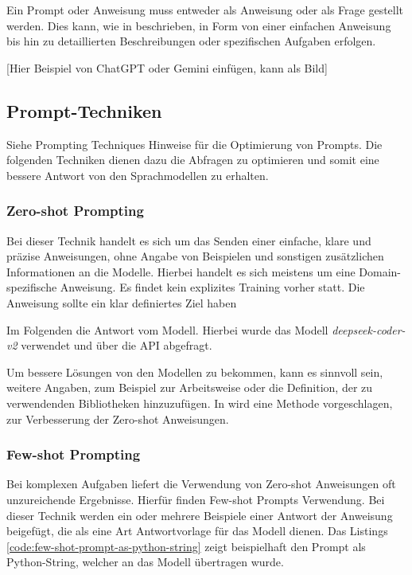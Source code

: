 Ein Prompt oder Anweisung muss entweder als Anweisung oder als Frage gestellt werden. Dies kann, wie in \cite{amatriain-2024} beschrieben, in Form von einer einfachen Anweisung bis hin zu detaillierten Beschreibungen oder spezifischen Aufgaben erfolgen.\vspace{0.2cm}

[Hier Beispiel von ChatGPT oder Gemini einfügen, kann als Bild]


\subsection{Prompt-Techniken}
Siehe Prompting Techniques Hinweise für die Optimierung von Prompts.
Die folgenden Techniken dienen dazu die Abfragen zu optimieren und somit eine bessere Antwort von den Sprachmodellen zu erhalten.


\subsubsection{Zero-shot Prompting}
Bei dieser Technik handelt es sich um das Senden einer einfache, klare und präzise Anweisungen, ohne Angabe von Beispielen und sonstigen zusätzlichen Informationen an die Modelle. Hierbei handelt es sich meistens um eine Domain-spezifische Anweisung. Es findet kein explizites Training vorher statt. Die Anweisung sollte ein klar definiertes Ziel haben\vspace{0.2cm}



Im Folgenden die Antwort vom Modell. Hierbei wurde das Modell \textit{deepseek-coder-v2} verwendet und über die API abgefragt.



Um bessere Lösungen von den Modellen zu bekommen, kann es sinnvoll sein, weitere Angaben, zum Beispiel zur Arbeitsweise oder die Definition, der zu verwendenden Bibliotheken hinzuzufügen. In \cite{wei-2021} wird eine Methode vorgeschlagen, zur Verbesserung der Zero-shot Anweisungen.


\subsubsection{Few-shot Prompting}
Bei komplexen Aufgaben liefert die Verwendung von Zero-shot Anweisungen oft unzureichende Ergebnisse. Hierfür finden Few-shot Prompts Verwendung. Bei dieser Technik werden ein oder mehrere Beispiele einer Antwort der Anweisung beigefügt, die als eine Art Antwortvorlage für das Modell dienen. Das Listings \ref{code:few-shot-prompt-as-python-string} zeigt beispielhaft den Prompt als Python-String, welcher an das Modell übertragen wurde.\vspace{0.2cm}


